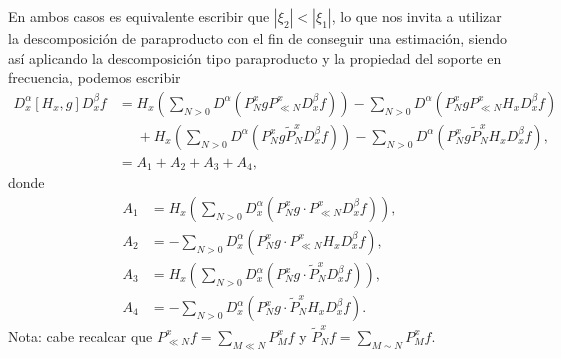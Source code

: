 \documentclass{aleph-revista}
\renewcommand{\tilde}{\widetilde}
\begin{document}
  En ambos casos es equivalente escribir que $|\xi_{2}|<|\xi_{1}|$, lo que nos invita a utilizar la descomposición de paraproducto con el fin de conseguir una estimación, siendo así aplicando la descomposición tipo paraproducto y la propiedad del soporte en frecuencia, podemos escribir
  \begin{align*}
    D_x^\alpha [H_x, g] D_x^\beta f &=H_{x}\left( \sum_{N>0}D^{\alpha}(P_{N}^{x}gP_{\ll N}^{x}D_{x}^{\beta}f) \right)-\sum_{N>0}D^{\alpha}(P_{N}^{x}gP_{\ll N}^{x}H_{x}D_{x}^{\beta}f)\\
    &\phantom{=}+H_{x}\left(\sum_{N>0}D^{\alpha}(P_{N}^{x}g\tilde{P}_{N}^{x}D_{x}^{\beta}f) \right)-\sum_{N>0}D^{\alpha}(P_{N}^{x}g\tilde{P}_{N}^{x}H_{x}D_{x}^{\beta}f),\\
    &= A_1 + A_2 + A_3 + A_4, 
  \end{align*}
  donde
  \begin{align*}
    A_1 &= H_x \left( \sum_{N>0} D_x^\alpha (P_N^x g \cdot P_{\ll N}^x D_x^\beta f) \right), \\
    A_2 &= - \sum_{N>0} D_x^\alpha (P_N^x g \cdot P_{\ll N}^x H_x D_x^\beta f), \\
    A_3 &= H_x \left( \sum_{N>0} D_x^\alpha (P_N^x g \cdot \tilde{P}_N^x D_x^\beta f) \right), \\
    A_4 &= - \sum_{N>0} D_x^\alpha (P_N^x g \cdot \tilde{P}_N^x H_x D_x^\beta f).
  \end{align*}
  Nota: cabe recalcar que $P_{\ll N}^{x}f=\sum_{M\ll N}P_{M}^{x}f$ y $\tilde{P}_{N}^{x}f=\sum_{M\sim N}P_{M}^{x}f$.
\end{document}
